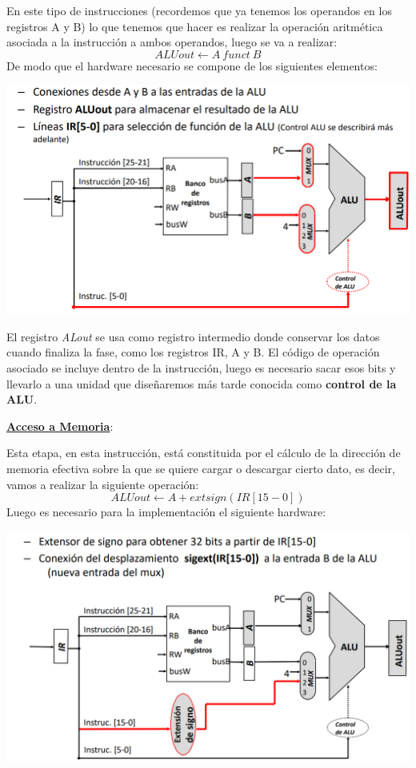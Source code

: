 \documentclass[a4paper,10pt]{book}
\begin{document}
En este tipo de instrucciones (recordemos que ya tenemos los operandos en los registros A y B) lo que tenemos que hacer es realizar la operación aritmética asociada a la instrucción a ambos operandos, luego se va a realizar:
$$ALUout \leftarrow A \ funct \ B$$
De modo que el hardware necesario se compone de los siguientes elementos:
\begin{center}
\includegraphics[scale=0.5]{ex aritmetico_logicas}
\end{center}
El registro \textit{ALout} se usa como registro intermedio donde conservar los datos cuando finaliza la fase, como los registros IR, A y B. El código de operación asociado se incluye dentro de la instrucción, luego es necesario sacar esos bits y llevarlo a una unidad que diseñaremos más tarde conocida como \textbf{control de la ALU}.

\underline{\textbf{Acceso a Memoria}}:

Esta etapa, en esta instrucción, está constituida por el cálculo de la dirección de memoria efectiva sobre la que se quiere cargar o descargar cierto dato, es decir, vamos a realizar la siguiente operación:
$$ALUout \leftarrow A+extsign(IR[15-0])$$
Luego es necesario para la implementación el siguiente hardware:
\begin{center}
\includegraphics[scale=0.5]{ex acceso memoria}
\end{center}
\end{document}
